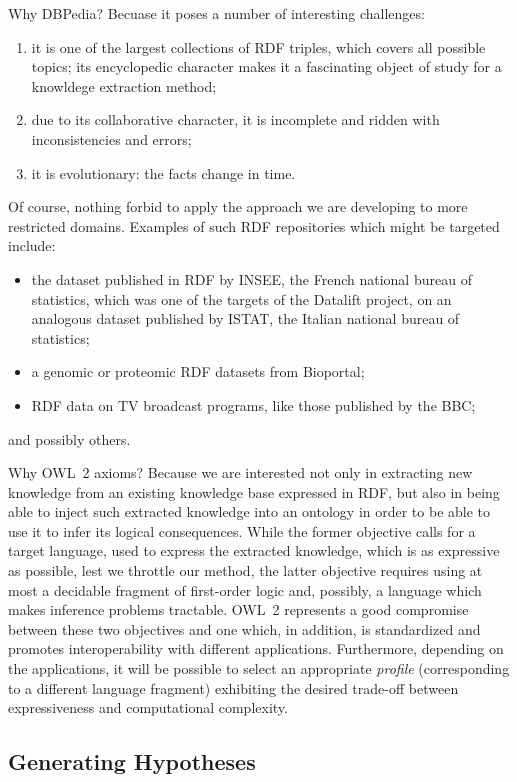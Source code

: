 \documentclass[a4paper]{article}
\newcounter{ex}
\begin{document}
Why DBPedia? Becuase it poses a number of interesting challenges:
\begin{enumerate}
\item it is one of the largest collections of RDF triples, which covers all possible
  topics; its encyclopedic character makes it a fascinating object of study for a
  knowldege extraction method;
\item due to its collaborative character, it is incomplete and ridden with inconsistencies
  and errors;
\item it is evolutionary: the facts change in time.
\end{enumerate}
Of course, nothing forbid to apply the approach we are developing to more restricted
domains. Examples of such RDF repositories which might be targeted include:
\begin{itemize}
\item the dataset published in RDF by INSEE, the French national bureau of statistics,
  which was one of the targets of the Datalift project, on an analogous dataset
  published by ISTAT, the Italian national bureau of statistics;
\item a genomic or proteomic RDF datasets from Bioportal;
\item RDF data on TV broadcast programs, like those published by the BBC;
\end{itemize}
and possibly others.

Why OWL~2 axioms?
Because we are interested not only in extracting new knowledge from an existing knowledge
base expressed in RDF, but also in being able to inject such extracted knowledge into
an ontology in order to be able to use it to infer its logical consequences.
While the former objective calls for a target language, used to express the extracted
knowledge, which is as expressive as possible, lest we throttle our method,
the latter objective requires using at most a decidable fragment of first-order logic
and, possibly, a language which makes inference problems tractable.
OWL~2 represents a good compromise between these two objectives and one which, in addition,
is standardized and promotes interoperability with different applications.
Furthermore, depending on the applications, it will be possible to select an appropriate
\emph{profile} (corresponding to a different language fragment) exhibiting the
desired trade-off between expressiveness and computational complexity.

\subsection{Generating Hypotheses}
\end{document}
